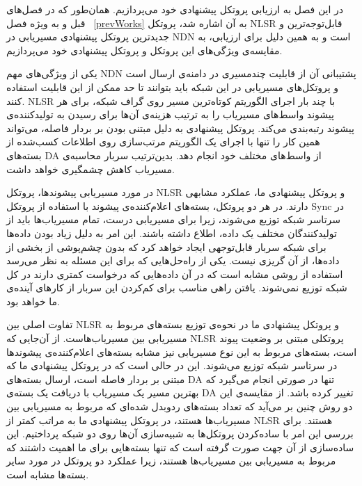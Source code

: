 
در این فصل به ارزیابی پروتکل پیشنهادی خود می‌پردازیم. همان‌طور که در فصل‌های قبل و به ویژه فصل ~\ref{prevWorks} به آن اشاره شد، پروتکل NLSR قابل‌توجه‌ترین و جدیدترین پروتکل پیشنهادی مسیریابی در NDN است و به همین دلیل برای ارزیابی، به مقایسه‌ی ویژگی‌های این پروتکل و پروتکل پیشنهادی خود می‌پردازیم.

یکی از ویژگی‌های مهم NDN پشتیبانی آن از قابلیت چندمسیری در دامنه‌ی ارسال است و پروتکل‌های مسیریابی در این شبکه باید بتوانند تا حد ممکن از این قابلیت استفاده کنند. NLSR با چند بار اجرای الگوریتم کوتاه‌ترین مسیر روی گراف شبکه، برای هر پیشوند واسط‌های مسیریاب را به ترتیب هزینه‌ی آن‌ها برای رسیدن به تولید‌کننده‌ی پیشوند رتبه‌بندی می‌کند. پروتکل پیشنهادی به دلیل مبتنی بودن بر بردار فاصله، می‌تواند همین کار را تنها با اجرای یک الگوریتم مرتب‌سازی روی اطلاعات کسب‌شده از بسته‌های DA از واسط‌های مختلف خود انجام دهد. بدین‌ترتیب سربار محاسبه‌ی مسیریاب کاهش چشمگیری خواهد داشت.

در مورد مسیریابی پیشوند‌ها، پروتکل NLSR و پروتکل پیشنهادی ما، عملکرد مشابهی دارند. در هر دو پروتکل، بسته‌های اعلام‌کننده‌ی پیشوند با استفاده از پروتکل Sync در سرتاسر شبکه توزیع می‌شوند، زیرا برای مسیریابی درست، تمام مسیریاب‌ها باید از تولیدکنندگان مختلف یک داده، اطلاع داشته باشند. این امر به دلیل زیاد بودن داده‌ها برای شبکه سربار قابل‌توجهی ایجاد خواهد کرد که بدون چشم‌پوشی از بخشی از داده‌ها، از آن گریزی نیست. یکی از راه‌حل‌هایی که برای این مسئله به نظر می‌رسد استفاده از روشی مشابه \cite{two-layer} است که در آن داده‌هایی که درخواست کمتری دارند در کل شبکه توزیع نمی‌شوند. یافتن راهی مناسب برای کم‌کردن این سربار از کارهای آینده‌ی ما خواهد بود.

تفاوت اصلی بین NLSR و پروتکل پیشنهادی ما در نحوه‌ی توزیع بسته‌های مربوط به مسیریابی بین مسیریاب‌هاست. از آن‌جایی که NLSR پروتکلی مبتنی بر وضعیت پیوند است، بسته‌های مربوط به این نوع مسیریابی نیز مشابه بسته‌های اعلام‌کننده‌ی پیشوندها در سرتاسر شبکه توزیع می‌شوند. این در حالی است که در پروتکل پیشنهادی ما که مبتنی بر بردار فاصله است، ارسال بسته‌های DA تنها در صورتی انجام می‌گیرد که بهترین مسیر یک مسیریاب با دریافت یک بسته‌ی DA  تغییر کرده باشد. از مقایسه‌ی این دو روش چنین بر می‌آید که تعداد بسته‌های ردوبدل شده‌ای که مربوط به مسیریابی بین مسیریاب‌ها هستند، در پروتکل پیشنهادی ما به مراتب کمتر از NLSR هستند. برای بررسی این امر با ساده‌کردن پروتکل‌ها به شبیه‌سازی آن‌ها روی دو شبکه پرداختیم. این ساده‌سازی از آن جهت صورت گرفته است که تنها بسته‌هایی برای ما اهمیت داشتند که مربوط به مسیریابی بین مسیریاب‌ها هستند، زیرا عملکرد دو پروتکل در مورد سایر بسته‌ها مشابه است. 

